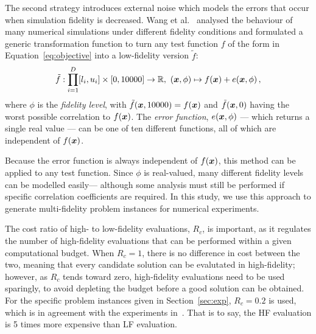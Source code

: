 The second strategy introduces external noise which models the errors that occur when simulation fidelity is decreased. Wang et al.~\cite{wang2017generic} analysed the behaviour of many numerical simulations under different fidelity conditions and 
formulated a generic transformation function to turn any test function $f$ of the form in Equation~\ref{eq:objective} into a low-fidelity version $\tilde f$:
\begin{equation}
\tilde f: \displaystyle\prod^D_{i=1}[l_i,u_i] \times [0,10000] \to \mathbb{R},\ (\V{x},\phi) \mapsto f(\V{x}) + e(\V{x},\phi)\,,\label{eq:error-fn}
\end{equation}
where $\phi$ is the \emph{fidelity level}, with $\tilde f(\boldsymbol{x},10000) = f(\boldsymbol{x})$ and $\tilde f(\boldsymbol{x},0)$ having the worst possible correlation to $f(\boldsymbol{x})$. The \emph{error function}, $e(\boldsymbol{x},\phi)$ --- which returns a single real value --- can be one of ten different functions, all of which are independent of $f(\boldsymbol{x})$.

Because the error function is always independent of $f(\boldsymbol{x})$, this method can be applied to any test function. Since $\phi$ is real-valued, many different fidelity levels can be modelled easily--- although some analysis must still be performed if specific correlation coefficients are required. In this study, we use this approach to generate multi-fidelity problem instances for numerical experiments. 

The cost ratio of high- to low-fidelity evaluations, $R_c$, is important, as it regulates the number of high-fidelity evaluations that can be performed within a given computational budget. When $R_c=1$, there is no difference in cost between the two, meaning that every candidate solution can be evalutated in high-fidelity; however, as $R_c$ tends toward zero, high-fidelity evaluations need to be used sparingly, to avoid depleting the budget before a good solution can be obtained. For the specific problem instances given in Section~\ref{sec:exp}, $R_c=0.2$ is used, which is in agreement with the experiments in~\cite{lv2021multi}. That is to say, the HF evaluation is 5 times more expensive than LF evaluation.

